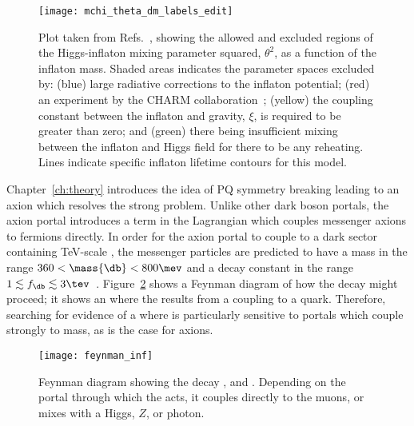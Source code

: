 \begin{figure}
  \begin{center}
    \texttt{[image: mchi\_theta\_dm\_labels\_edit]}
    \caption[Parameter space for a model including an inflaton]
    {
      Plot taken from Refs.~\protect\cite{Bezrukov:2014nza,Bezrukov:2013fca}, showing the allowed
      and excluded
      regions of the Higgs-inflaton mixing parameter squared, $\theta^2$, as a function of the
      inflaton mass.
      Shaded areas indicates the parameter spaces excluded by:
      (blue) large radiative corrections to the inflaton potential;
      (red) an experiment by the CHARM collaboration~\protect\cite{Bergsma:1985qz};
      (yellow) the coupling constant between the inflaton and gravity, $\xi$, is required to be
      greater than zero; and
      (green) there being insufficient mixing between the inflaton and Higgs field for there to be
      any reheating.
      Lines indicate specific inflaton lifetime contours for this model.
    }
    \label{fig:db:inflaton}
  \end{center}
\end{figure}


Chapter~\ref{ch:theory} introduces the idea of \gls{PQ} symmetry breaking leading to an axion
which resolves the strong \CP problem.
Unlike other dark boson portals, the axion portal introduces a term in the Lagrangian which couples
messenger axions to fermions directly.
In order for the axion portal to couple to a dark sector containing TeV-scale \dm, the messenger
particles are predicted to have a mass in the range $360<\mass{\db}<800\mev$ and a decay
constant in the range $1\lesssim f_\db\lesssim3\tev$~\cite{Nomura:2008ru}.
Figure~\ref{fig:db:feynman} shows a Feynman diagram of how the decay \btokstrdb might proceed;
it shows an \fcnc where the \db results from a coupling to a \tquark quark.
Therefore, searching for evidence of a \btokstrdb where \dbtomumu is particularly sensitive to
portals which couple strongly to mass, as is the case for axions.

\begin{figure}
  \begin{center}
    \texttt{[image: feynman\_inf]}
    \caption[Feynman diagram for the decay \btokstrdb]
    {
      Feynman diagram showing the decay \btokstrdb, and \dbtomumu.
      Depending on the portal through which the \db acts, it couples directly to the muons, or
      mixes with a \sm Higgs, $Z$, or photon.
    }
    \label{fig:db:feynman}
  \end{center}
\end{figure}

